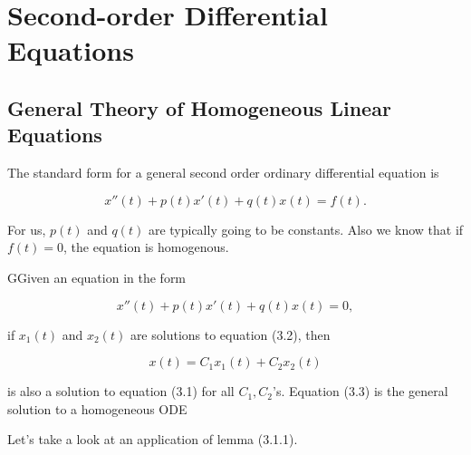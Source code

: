 \chapter{Second-order Differential Equations}

\section{General Theory of Homogeneous Linear Equations}
  The standard form for a general second order ordinary differential equation is

  \begin{equation}
    x''(t)+p(t)x'(t)+q(t)x(t)=f(t).
  \end{equation}
  
  For us, $p(t)$ and $q(t)$ are typically going to be constants. Also we know that if $f(t)=0$, the equation is homogenous.

  \begin{lemma}
    GGiven an equation in the form 

    \begin{equation}
      x''(t)+p(t)x'(t)+q(t)x(t)=0,
    \end{equation}

    if $x_1(t)$ and $x_2(t)$ are solutions to equation (3.2), then 

    \begin{equation}
      x(t)=C_1x_1(t)+C_2x_2(t)
    \end{equation}

    is also a solution to equation (3.1) for all $C_1,C_2$'s. Equation (3.3) is the general solution to a homogeneous ODE
  \end{lemma}

  Let's take a look at an application of lemma (3.1.1).

